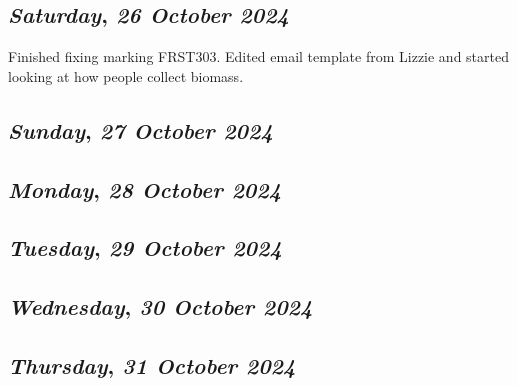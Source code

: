 \def\day{\textit{26 October 2024}}
\def\weekday{\textit{Saturday}}
\subsection*{\weekday, \day}
Finished fixing marking FRST303. Edited email template from Lizzie and started looking at how people collect biomass.

\def\day{\textit{27 October 2024}}
\def\weekday{\textit{Sunday}}
\subsection*{\weekday, \day}

\def\day{\textit{28 October 2024}}
\def\weekday{\textit{Monday}}
\subsection*{\weekday, \day}

\def\day{\textit{29 October 2024}}
\def\weekday{\textit{Tuesday}}
\subsection*{\weekday, \day}

\def\day{\textit{30 October 2024}}
\def\weekday{\textit{Wednesday}}
\subsection*{\weekday, \day}

\def\day{\textit{31 October 2024}}
\def\weekday{\textit{Thursday}}
\subsection*{\weekday, \day}
